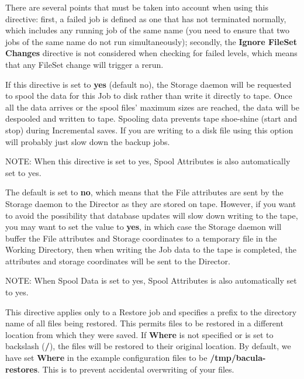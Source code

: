 \begin{description}
   There are several points that must be taken into account when using this
   directive: first, a failed job is defined as one that has not terminated
   normally, which includes any running job of the same name (you need to
   ensure that two jobs of the same name do not run simultaneously);
   secondly, the {\bf Ignore FileSet Changes} directive is not considered 
   when checking for failed levels, which means that any FileSet change will
   trigger a rerun.

\item [Spool Data = \lt{}yes\vb{}no\gt{}]

   If this directive is set  to {\bf yes} (default no), the Storage daemon will
   be requested  to spool the data for this Job to disk rather than write it 
   directly to tape. Once all the data arrives or the spool files' maximum sizes
   are reached, the data will be despooled and written  to tape. Spooling data 
   prevents tape  shoe-shine (start and stop) during
   Incremental saves. If you are writing to a disk file using this option
   will probably just slow down the backup jobs.

   NOTE: When this directive is set to yes, Spool Attributes is also
   automatically set to yes.

\item [Spool Attributes = \lt{}yes\vb{}no\gt{}]
   The default is set to {\bf no}, which means that the File attributes are
   sent by the Storage daemon to the Director as they are stored on tape.
   However, if you want to avoid the possibility that database updates will
   slow down writing to the tape, you may want to set the value to {\bf
   yes}, in which case the Storage daemon will buffer the File attributes
   and Storage coordinates to a temporary file in the Working Directory,
   then when writing the Job data to the tape is completed, the attributes
   and storage coordinates will be sent to the Director.

   NOTE: When Spool Data is set to yes, Spool Attributes is also
   automatically set to yes.

\item [Where = \lt{}directory\gt{}]
   This directive applies only to a Restore job and specifies a prefix to
   the directory name of all files being restored.  This permits files to
   be restored in a different location from which they were saved.  If {\bf
   Where} is not specified or is set to backslash ({\bf /}), the files will
   be restored to their original location.  By default, we have set {\bf
   Where} in the example configuration files to be {\bf
   /tmp/bacula-restores}.  This is to prevent accidental overwriting of
   your files.


\end{description}
